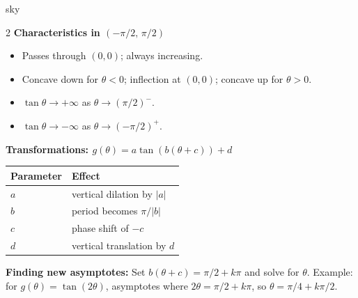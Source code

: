 \documentclass[10pt]{article}
\begin{document}
\begin{skillbox}{sky}
  \begin{multicols}{2}
  \textbf{Characteristics in $(-\pi/2,\,\pi/2)$}
  \begin{itemize}
    \item Passes through $(0,0)$; always increasing.
    \item Concave down for $\theta<0$; inflection at $(0,0)$;
          concave up for $\theta>0$.
    \item $\tan\theta\to+\infty$ as $\theta\to(\pi/2)^-$.
    \item $\tan\theta\to-\infty$ as $\theta\to(-\pi/2)^+$.
  \end{itemize}

  \columnbreak

  \textbf{Transformations: $g(\theta)=a\tan(b(\theta+c))+d$}

  \renewcommand{\arraystretch}{1.4}
  \begin{tabular}{@{}ll@{}}
  Parameter & Effect \\
  \hline
  $a$ & vertical dilation by $|a|$ \\
  $b$ & period becomes $\pi/|b|$ \\
  $c$ & phase shift of $-c$ \\
  $d$ & vertical translation by $d$ \\
  \end{tabular}
  \end{multicols}

  \textbf{Finding new asymptotes:} Set $b(\theta+c)=\pi/2+k\pi$ and
  solve for $\theta$. Example: for $g(\theta)=\tan(2\theta)$,
  asymptotes where $2\theta=\pi/2+k\pi$, so $\theta=\pi/4+k\pi/2$.
\end{skillbox}
\end{document}
